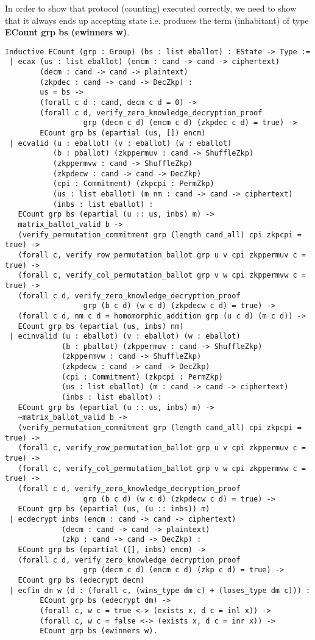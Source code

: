 \documentclass{llncs}
\begin{document}
 
 In order to show that protocol (counting)
 executed correctly, we need to show that it always ends up accepting state i.e. 
 produces the term (inhabitant) of type \textbf{ECount grp bs (ewinners w)}.



\begin{verbatim}
Inductive ECount (grp : Group) (bs : list eballot) : EState -> Type :=
 | ecax (us : list eballot) (encm : cand -> cand -> ciphertext)
        (decm : cand -> cand -> plaintext)
        (zkpdec : cand -> cand -> DecZkp) :
        us = bs ->
        (forall c d : cand, decm c d = 0) -> 
        (forall c d, verify_zero_knowledge_decryption_proof 
                  grp (decm c d) (encm c d) (zkpdec c d) = true) ->
        ECount grp bs (epartial (us, []) encm)
 | ecvalid (u : eballot) (v : eballot) (w : eballot)
           (b : pballot) (zkppermuv : cand -> ShuffleZkp)
           (zkppermvw : cand -> ShuffleZkp) 
           (zkpdecw : cand -> cand -> DecZkp)
           (cpi : Commitment) (zkpcpi : PermZkp)
           (us : list eballot) (m nm : cand -> cand -> ciphertext)
           (inbs : list eballot) :
   ECount grp bs (epartial (u :: us, inbs) m) ->
   matrix_ballot_valid b ->
   (verify_permutation_commitment grp (length cand_all) cpi zkpcpi = true) ->
   (forall c, verify_row_permutation_ballot grp u v cpi zkppermuv c = true) ->
   (forall c, verify_col_permutation_ballot grp v w cpi zkppermvw c = true) ->
   (forall c d, verify_zero_knowledge_decryption_proof 
                  grp (b c d) (w c d) (zkpdecw c d) = true) ->
   (forall c d, nm c d = homomorphic_addition grp (u c d) (m c d)) -> 
   ECount grp bs (epartial (us, inbs) nm)
 | ecinvalid (u : eballot) (v : eballot) (w : eballot)
             (b : pballot) (zkppermuv : cand -> ShuffleZkp)
             (zkppermvw : cand -> ShuffleZkp) 
             (zkpdecw : cand -> cand -> DecZkp)
             (cpi : Commitment) (zkpcpi : PermZkp)
             (us : list eballot) (m : cand -> cand -> ciphertext)
             (inbs : list eballot) :
   ECount grp bs (epartial (u :: us, inbs) m) ->
   ~matrix_ballot_valid b ->
   (verify_permutation_commitment grp (length cand_all) cpi zkpcpi = true) ->
   (forall c, verify_row_permutation_ballot grp u v cpi zkppermuv c = true) ->
   (forall c, verify_col_permutation_ballot grp v w cpi zkppermvw c = true) ->
   (forall c d, verify_zero_knowledge_decryption_proof 
                  grp (b c d) (w c d) (zkpdecw c d) = true) ->
   ECount grp bs (epartial (us, (u :: inbs)) m)
 | ecdecrypt inbs (encm : cand -> cand -> ciphertext)
             (decm : cand -> cand -> plaintext)
             (zkp : cand -> cand -> DecZkp) :
   ECount grp bs (epartial ([], inbs) encm) ->
   (forall c d, verify_zero_knowledge_decryption_proof
                  grp (decm c d) (encm c d) (zkp c d) = true) ->
   ECount grp bs (edecrypt decm)
 | ecfin dm w (d : (forall c, (wins_type dm c) + (loses_type dm c))) :
        ECount grp bs (edecrypt dm) ->
        (forall c, w c = true <-> (exists x, d c = inl x)) ->
        (forall c, w c = false <-> (exists x, d c = inr x)) ->
        ECount grp bs (ewinners w). 
\end{verbatim}
 
\end{document}

